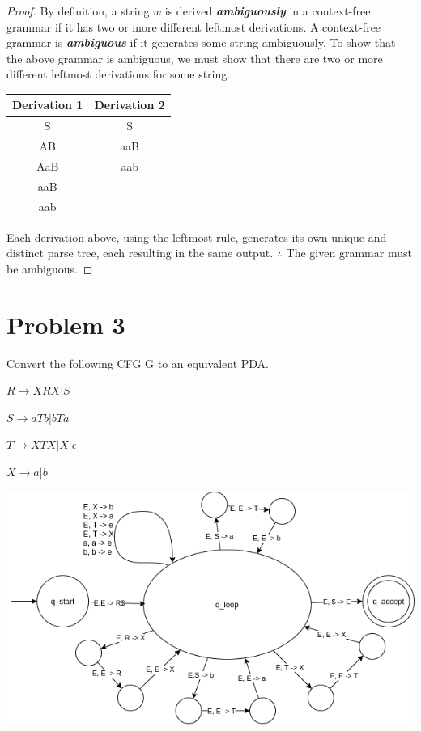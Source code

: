 \documentclass[11pt]{article}
\begin{document}
\begin{proof}
By definition, a string $w$ is derived \textbf{\textit{ambiguously}} in a context-free grammar if it has two or more different leftmost derivations. A context-free grammar is \textbf{\textit{ambiguous}} if it generates some string ambiguously.
\newline
\newline
\noindent
To show that the above grammar is ambiguous, we must show that there are two or more different leftmost derivations for some string.
\begin{center}
\begin{tabular}{ c | c }
 Derivation 1 & Derivation 2 \\
 \hline 
 S & S \\
 AB & aaB \\
 AaB & aab \\
 aaB &  \\
 aab &  
\end{tabular}
\end{center}
Each derivation above, using the leftmost rule, generates its own unique and distinct parse tree, each resulting in the same output.
\newline
\newline
\noindent
$\therefore$ The given grammar must be ambiguous.
\end{proof}






\newpage
\section*{Problem 3}

\noindent
Convert the following CFG G to an equivalent PDA.

$R\rightarrow XRX|S$

$S\rightarrow aTb|bTa$

$T\rightarrow XTX|X|\epsilon$

$X\rightarrow a|b$

\begin{center}
    \includegraphics[scale=0.72]{HW-03-problem3.png}
\end{center}
\end{document}
